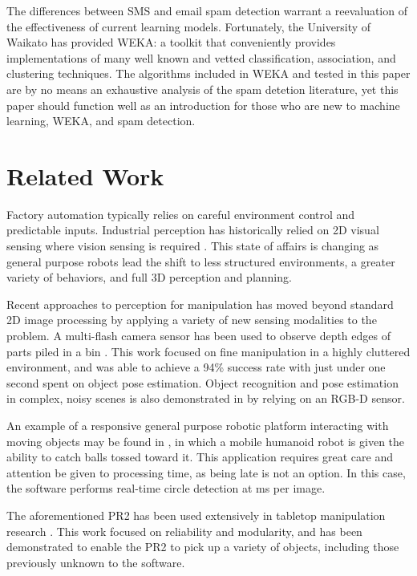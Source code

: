 \documentclass[letterpaper, 10 pt, conference]{ieeeconf}  %
\begin{document}
The differences between SMS and email spam detection warrant a
reevaluation of the effectiveness of current learning models. Fortunately, the University of Waikato has provided WEKA: a toolkit that conveniently provides implementations of many well known and vetted classification, association, and clustering techniques. The algorithms included in WEKA and tested in this paper are by no means an exhaustive analysis of the spam detetion literature, yet this paper should function well as an introduction for those who are new to machine learning, WEKA, and spam detection.

\section{Related Work}
Factory automation typically relies on careful environment control and
predictable inputs. Industrial perception has historically relied on
2D visual sensing where vision sensing is required
\cite{NIST2012:BinPicking}. This state of affairs is changing as
general purpose robots lead the shift to less structured environments,
a greater variety of behaviors, and full 3D perception and planning.

Recent approaches to perception for manipulation has moved beyond
standard 2D image processing by applying a variety of new sensing
modalities to the problem. A multi-flash camera sensor has been used
to observe depth edges of parts piled in a bin
\cite{Liu2012:BinPicking}. This work focused on fine manipulation in a
highly cluttered environment, and was able to achieve a 94\% success
rate with just under one second spent on object pose
estimation. Object recognition and pose estimation in complex, noisy
scenes is also demonstrated in \cite{Papazov2012:Grasping} by relying
on an RGB-D sensor.

An example of a responsive general purpose robotic platform
interacting with moving objects may be found in
\cite{Birbach2011:Catch}, in which a mobile humanoid robot is given
the ability to catch balls tossed toward it. This application requires
great care and attention be given to processing time, as being late is
not an option. In this case, the software performs real-time circle
detection at \unit[35]{ms} per image.

The aforementioned PR2 has been used extensively in tabletop
manipulation research \cite{WGObjectManipulation}. This work focused
on reliability and modularity, and has been demonstrated to enable the
PR2 to pick up a variety of objects, including those previously
unknown to the software.
\end{document}
